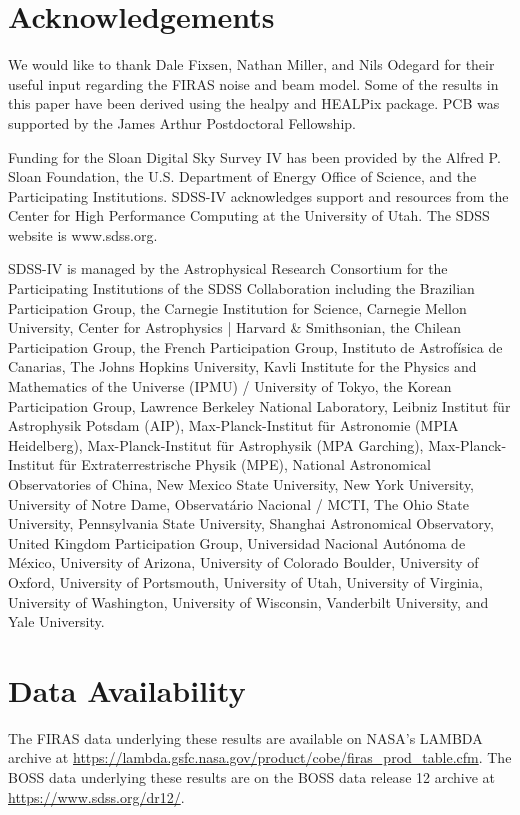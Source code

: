 \documentclass[fleqn,usenatbib]{mnras}
\begin{document}
\section*{Acknowledgements}
\label{sec:Acknowledgements}
We would like to thank Dale Fixsen, Nathan Miller, and Nils Odegard for their useful input regarding the FIRAS noise and beam model. Some of the results in this paper have been derived using the healpy and HEALPix package.  PCB was supported by the James Arthur Postdoctoral Fellowship.

Funding for the Sloan Digital Sky Survey IV has been provided by the Alfred P. Sloan Foundation, the U.S. Department of Energy Office of Science, and the Participating Institutions. SDSS-IV acknowledges support and resources from the Center for High Performance Computing  at the University of Utah. The SDSS website is www.sdss.org.

SDSS-IV is managed by the Astrophysical Research Consortium for the Participating Institutions of the SDSS Collaboration including the Brazilian Participation Group, the Carnegie Institution for Science, Carnegie Mellon University, Center for Astrophysics | Harvard \& Smithsonian, the Chilean Participation Group, the French Participation Group, Instituto de Astrof\'isica de Canarias, The Johns Hopkins University, Kavli Institute for the Physics and Mathematics of the Universe (IPMU) / University of Tokyo, the Korean Participation Group, Lawrence Berkeley National Laboratory, Leibniz Institut f\"ur Astrophysik Potsdam (AIP),  Max-Planck-Institut f\"ur Astronomie (MPIA Heidelberg), Max-Planck-Institut f\"ur Astrophysik (MPA Garching), Max-Planck-Institut f\"ur Extraterrestrische Physik (MPE), National Astronomical Observatories of China, New Mexico State University, New York University, University of Notre Dame, Observat\'ario Nacional / MCTI, The Ohio State University, Pennsylvania State University, Shanghai Astronomical Observatory, United Kingdom Participation Group, Universidad Nacional Aut\'onoma de M\'exico, University of Arizona, University of Colorado Boulder, University of Oxford, University of Portsmouth, University of Utah, University of Virginia, University of Washington, University of Wisconsin, Vanderbilt University, and Yale University.

\section*{Data Availability}
The FIRAS data underlying these results are available on NASA's LAMBDA archive at \url{https://lambda.gsfc.nasa.gov/product/cobe/firas_prod_table.cfm}. The BOSS data underlying these results are on the BOSS data release 12 archive at \url{https://www.sdss.org/dr12/}.
\end{document}
